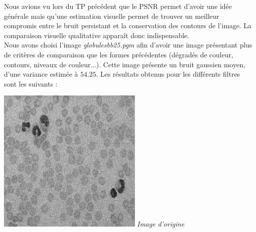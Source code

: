 \documentclass[a4,12pt]{article}
\begin{document}
Nous avions vu lors du TP précédent que le PSNR permet d'avoir une idée générale mais qu'une estimation visuelle permet de trouver un meilleur compromis entre le bruit persistant et la conservation des contours de l'image. La comparaison visuelle qualitative apparaît donc indispensable.\\

Nous avons choisi l'image \textit{globulesbb25.pgm} afin d'avoir une image présentant plus de critères de comparaison que les formes précédentes (dégradés de couleur, contours, niveaux de couleur...). Cette image présente un bruit gaussien moyen, d'une variance estimée à $54.25$. Les résultats obtenus pour les différents filtres sont les suivants :\\


\noindent
\begin{center}
	\begin{minipage}[c]{0.45\linewidth}
		\begin{center}
			\includegraphics[width = 70mm]{./img/globOrig.jpg}
			\textit{Image d'origine}
		\end{center}
	\end{minipage}
\end{center}
\end{document}
